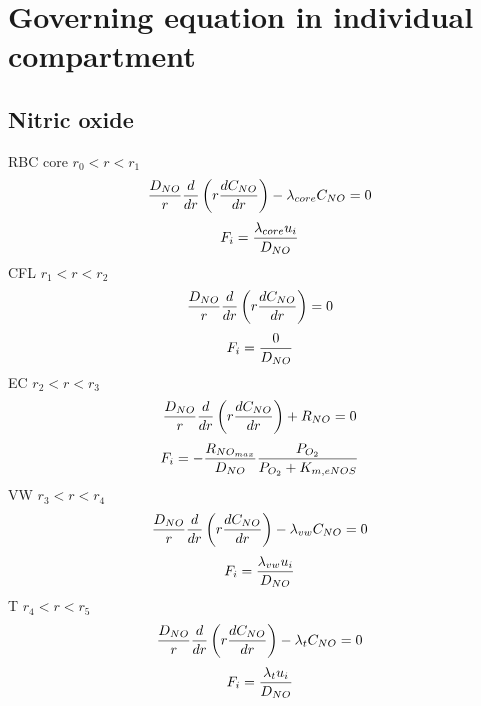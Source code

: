 \section{Governing equation in individual compartment}
\subsection{Nitric oxide}
RBC core $r_0 < r < r_1$
\begin{equation*}
\frac{D_{NO}}{r} \frac{d}{dr} \left (r \frac{dC_{NO}}{dr} \right) - 
\lambda_{core} C_{NO} = 0
\end{equation*}
\begin{equation*}
F_i = \frac{\lambda_{core} u_i}{D_{NO}}
\end{equation*}
CFL $r_1<r<r_2$
\begin{equation*}
\frac{D_{NO}}{r} \frac{d}{dr} \left (r \frac{dC_{NO}}{dr} \right) = 0
\end{equation*}
\begin{equation*}
F_i = \frac{0}{D_{NO}}
\end{equation*}
EC $r_2<r<r_3$
\begin{equation*}
\frac{D_{NO}}{r} \frac{d}{dr} \left (r \frac{dC_{NO}}{dr} \right) + R_{NO} = 0
\end{equation*}
\begin{equation*}
F_i = -\frac{R_{NO_{max}}}{D_{NO}} \frac{P_{O_2}}{P_{O_2} + K_{m, eNOS}}
\end{equation*}
VW $r_3<r<r_4$
\begin{equation*}
\frac{D_{NO}}{r} \frac{d}{dr} \left (r \frac{dC_{NO}}{dr} \right) - 
\lambda_{vw} C_{NO} = 0
\end{equation*}
\begin{equation*}
F_i = \frac{\lambda_{vw} u_i}{D_{NO}}
\end{equation*}
T $r_4<r<r_5$
\begin{equation*}
\frac{D_{NO}}{r} \frac{d}{dr} \left (r \frac{dC_{NO}}{dr} \right) - \lambda_{t} 
C_{NO} = 0
\end{equation*}
\begin{equation*}
F_i = \frac{\lambda_{t} u_i}{D_{NO}}
\end{equation*}


